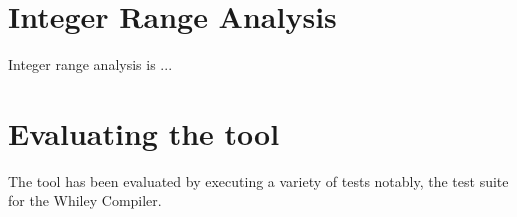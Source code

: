 \section{Integer Range Analysis}

Integer range analysis is ... 

\section{Evaluating the tool}
The tool has been evaluated by executing a variety of tests notably, the test suite for the Whiley Compiler.
